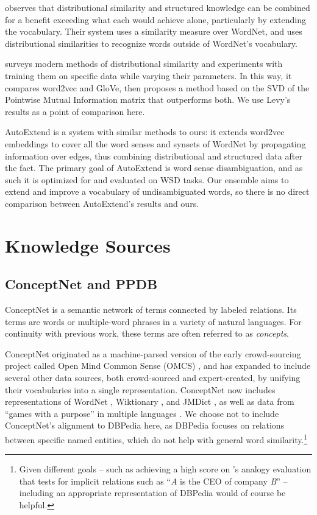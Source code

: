 \documentclass[11pt,letterpaper]{article}
\begin{document}
 observes that distributional similarity and
structured knowledge can be combined for a benefit exceeding what each would
achieve alone, particularly by extending the vocabulary. Their system uses a
similarity measure over WordNet, and uses distributional similarities to
recognize words outside of WordNet's vocabulary.

 surveys modern methods of distributional similarity
and experiments with training them on specific data while varying their
parameters. In this way, it compares word2vec and GloVe, then proposes a method
based on the SVD of the Pointwise Mutual Information matrix that outperforms
both. We use Levy's results as a point of comparison here.

AutoExtend \cite{rothe2015autoextend} is a system with similar methods to
ours: it extends word2vec embeddings to cover all the word senses and synsets of
WordNet by propagating information over edges, thus combining distributional and
structured data after the fact. The primary goal of AutoExtend is word sense
disambiguation, and as such it is optimized for and evaluated on WSD tasks.
Our ensemble aims to extend and improve a vocabulary of undisambiguated words,
so there is no direct comparison between AutoExtend's results and ours.

\section{Knowledge Sources}

\subsection{ConceptNet and PPDB}
ConceptNet \cite{speer2012conceptnet} is a semantic network of terms
connected by labeled relations. Its terms are words or multiple-word phrases
in a variety of natural languages. For continuity with previous work,
these terms are often referred to as {\em concepts}.

ConceptNet originated as a machine-parsed version of the early crowd-sourcing
project called Open Mind Common Sense (OMCS) \cite{singh2002omcs}, and has expanded
to include several other data sources, both crowd-sourced and expert-created,
by unifying their vocabularies into a single representation. ConceptNet now includes
representations of WordNet \cite{miller1998wordnet}, Wiktionary \cite{wiktionary2014en},
and JMDict \cite{breen2004jmdict}, as well as data from ``games with a purpose'' in
multiple languages \cite{vonahn2006verbosity,kuo2009petgame,nakahara2011nadya}.
We choose not to include ConceptNet's alignment to DBPedia
\cite{auer2007dbpedia}
here, as DBPedia focuses on relations between specific named entities, which do not help
with general word similarity.\footnote{
    Given different goals -- such as achieving a high score on
    's analogy evaluation that tests for
    implicit relations such as ``{\em A} is the CEO of company {\em B}'' --
    including an appropriate representation of DBPedia would of course be helpful.
}
\end{document}
